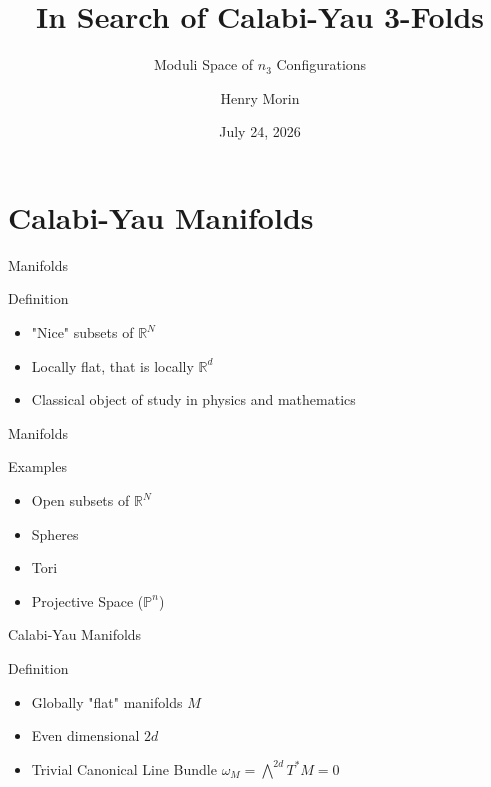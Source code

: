 \documentclass[aspectratio=169]{beamer}
\title{In Search of Calabi-Yau 3-Folds}
\subtitle{Moduli Space of $n_3$ Configurations}
\author{Henry Morin}
\institute{Under the Supervision of Jenia Tevelev}
\date{July 24, 2026}
\begin{document}
\begin{frame}
  \titlepage
\end{frame}

%
\section{Calabi-Yau Manifolds}


\begin{frame}{Manifolds}
      \begin{block}{Definition}
        \begin{itemize}
            \item "Nice" subsets of $\mathbb{R}^N$
            \item Locally flat, that is locally $\mathbb{R}^d$
          \item Classical object of study in physics and mathematics
        \end{itemize}
    \end{block}
\end{frame}

\begin{frame}{Manifolds}
        \begin{block}{Examples}
            \begin{itemize}
                \item Open subsets of $\mathbb{R}^N$
                \item Spheres
                \item Tori
                \item Projective Space ($\mathbb{P}^n$)
            \end{itemize}
        \end{block}
\end{frame}


\begin{frame}{Calabi-Yau Manifolds}
    \begin{block}{Definition}
        \begin{itemize}
            \item Globally "flat" manifolds $M$
            \item Even dimensional $2d$
            \item Trivial Canonical Line Bundle $\omega_M = \bigwedge^{2d}T^{\ast}M = 0$
        \end{itemize}
    \end{block}
\end{frame}
\end{document}
